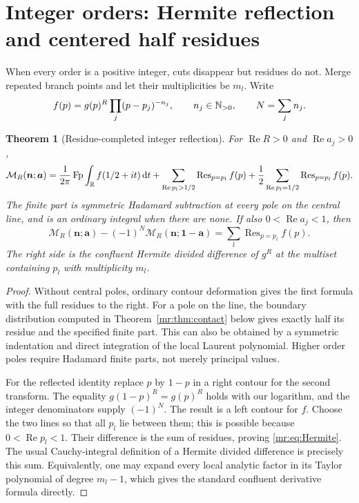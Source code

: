 \documentclass[11pt,letterpaper]{article}
\newtheorem{theorem}{Theorem}[section]
\theoremstyle{definition}\newtheorem{definition}[theorem]{Definition}
\theoremstyle{remark}\newtheorem{remark}[theorem]{Remark}
\newcommand{\Rea}{\operatorname{Re}}\newcommand{\Ima}{\operatorname{Im}}
\newcommand{\Res}{\operatorname{Res}}\newcommand{\Log}{\operatorname{Log}}
\newcommand{\dd}{\,\mathrm d}\newcommand{\M}{\mathcal M}
\begin{document}
\section{Integer orders: Hermite reflection and centered half residues}
\label{mr:sec:integer}
When every order is a positive integer, cuts disappear but residues do
not. Merge repeated branch points and let their multiplicities be $m_l$.
Write
\begin{equation}\label{mr:eq:integerf}
 f(p)=g(p)^R\prod_j(p-p_j)^{-n_j},\qquad n_j\in\mathbb N_{>0},
 \qquad N=\sum_jn_j.
\end{equation}

\begin{theorem}[Residue-completed integer reflection]\label{mr:thm:integer}
For $\Rea R>0$ and $\Rea a_j>0$,
\begin{equation}\label{mr:eq:integercentral}
 \M_R(\boldsymbol n;\boldsymbol a)
 =\frac1{2\pi}\Fp\int_\R f(1/2+it)\dd t
   +\sum_{\Rea p_l>1/2}\Res_{p=p_l}f(p)
   +\frac12\sum_{\Rea p_l=1/2}\Res_{p=p_l}f(p).
\end{equation}
The finite part is symmetric Hadamard subtraction at every pole on the
central line, and is an ordinary integral when there are none.
If also $0<\Rea a_j<1$, then
\begin{equation}\label{mr:eq:Hermite}
 \boxed{\M_R(\boldsymbol n;\boldsymbol a)
       -(-1)^N\M_R(\boldsymbol n;\boldsymbol1-\boldsymbol a)
       =\sum_l\Res_{p=p_l}f(p).}
\end{equation}
The right side is the confluent Hermite divided difference of $g^R$
at the multiset containing $p_l$ with multiplicity $m_l$.
\end{theorem}
\begin{proof}
Without central poles, ordinary contour deformation gives the first
formula with the full residues to the right. For a pole on the line,
the boundary distribution computed in Theorem~\ref{mr:thm:contact}
below gives exactly half its residue and the specified finite part.
This can also be obtained by a symmetric indentation and direct
integration of the local Laurent polynomial. Higher order poles
require Hadamard finite parts, not merely principal values.

For the reflected identity replace $p$ by $1-p$ in a right contour
for the second transform. The equality $g(1-p)^R=g(p)^R$ holds with
our logarithm, and the integer denominators supply $(-1)^N$.
The result is a left contour for $f$. Choose the two lines so that all
$p_l$ lie between them; this is possible because $0<\Rea p_l<1$.
Their difference is the sum of residues, proving \eqref{mr:eq:Hermite}.
The usual Cauchy-integral definition of a Hermite divided difference
is precisely this sum. Equivalently, one may expand every local
analytic factor in its Taylor polynomial of degree $m_l-1$, which
gives the standard confluent derivative formula directly.
\end{proof}
\end{document}
